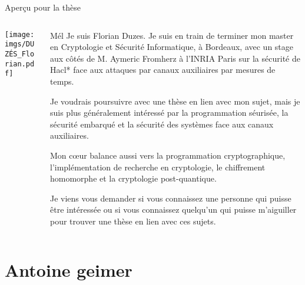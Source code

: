 \documentclass[A4,svgnames,9pt,aspectratio=169]{beamer}
\begin{document}
\begin{frame}{Aperçu pour la thèse}
  \begin{columns}
    \begin{column}{0.5\textwidth}
      \center
      \texttt{[image: imgs/DUZÉS\_Florian.pdf]}
    \end{column}
    \begin{column}{0.5\textwidth}
      \begin{block}{Mél}
        \footnotesize
        Je suis Florian Duzes. Je suis en train de terminer mon master en
        Cryptologie et Sécurité Informatique, à Bordeaux, avec un stage aux
        côtés de M. Aymeric Fromherz à l'INRIA Paris sur la sécurité de Hacl*
        face aux attaques par canaux auxiliaires par mesures de temps.

        Je voudrais poursuivre avec une thèse en lien avec mon sujet, mais je
        suis plus généralement intéressé par la programmation séurisée, la
        sécurité embarqué et la sécurité des systèmes face aux canaux
        auxiliaires.

        Mon cœur balance aussi vers la programmation cryptographique,
        l'implémentation de recherche en cryptologie, le chiffrement homomorphe
        et la cryptologie post-quantique.

        Je viens vous demander si vous connaissez une personne qui puisse être
        intéressée ou si vous connaissez quelqu'un qui puisse m'aiguiller pour
        trouver une thèse en lien avec ces sujets.
      \end{block}
    \end{column}
  \end{columns}
\end{frame}



 
\section{Antoine geimer}
\frame{\sectionpage}
\end{document}
